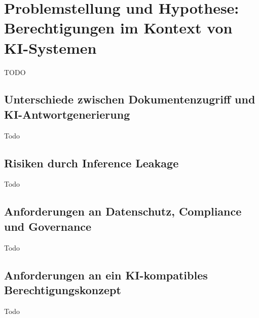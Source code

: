 \section{Problemstellung und Hypothese: Berechtigungen im Kontext von KI-Systemen}
TODO

\subsection{Unterschiede zwischen Dokumentenzugriff und KI-Antwortgenerierung}
Todo

\subsection{Risiken durch Inference Leakage}
Todo

\subsection{Anforderungen an Datenschutz, Compliance und Governance}
Todo

\subsection{Anforderungen an ein KI-kompatibles Berechtigungskonzept}
Todo
